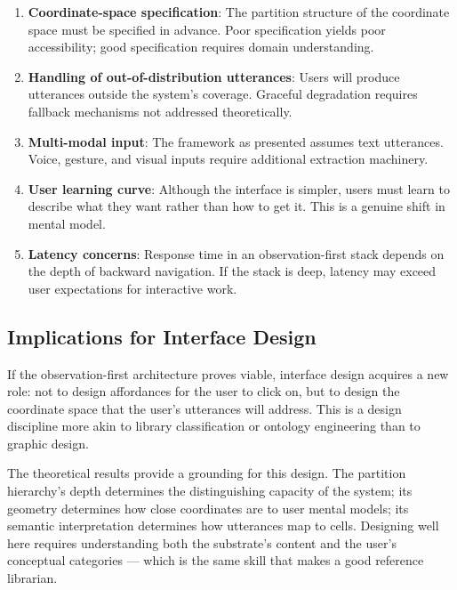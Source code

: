 \documentclass[11pt,a4paper]{article}
\theoremstyle{definition}
\theoremstyle{remark}
\begin{document}
\begin{enumerate}
    \item \textbf{Coordinate-space specification}: The partition structure of the coordinate space must be specified in advance. Poor specification yields poor accessibility; good specification requires domain understanding.

    \item \textbf{Handling of out-of-distribution utterances}: Users will produce utterances outside the system's coverage. Graceful degradation requires fallback mechanisms not addressed theoretically.

    \item \textbf{Multi-modal input}: The framework as presented assumes text utterances. Voice, gesture, and visual inputs require additional extraction machinery.

    \item \textbf{User learning curve}: Although the interface is simpler, users must learn to describe what they want rather than how to get it. This is a genuine shift in mental model.

    \item \textbf{Latency concerns}: Response time in an observation-first stack depends on the depth of backward navigation. If the stack is deep, latency may exceed user expectations for interactive work.
\end{enumerate}

\subsection{Implications for Interface Design}

If the observation-first architecture proves viable, interface design acquires a new role: not to design affordances for the user to click on, but to design the coordinate space that the user's utterances will address. This is a design discipline more akin to library classification or ontology engineering than to graphic design.

The theoretical results provide a grounding for this design. The partition hierarchy's depth determines the distinguishing capacity of the system; its geometry determines how close coordinates are to user mental models; its semantic interpretation determines how utterances map to cells. Designing well here requires understanding both the substrate's content and the user's conceptual categories --- which is the same skill that makes a good reference librarian.
\end{document}

